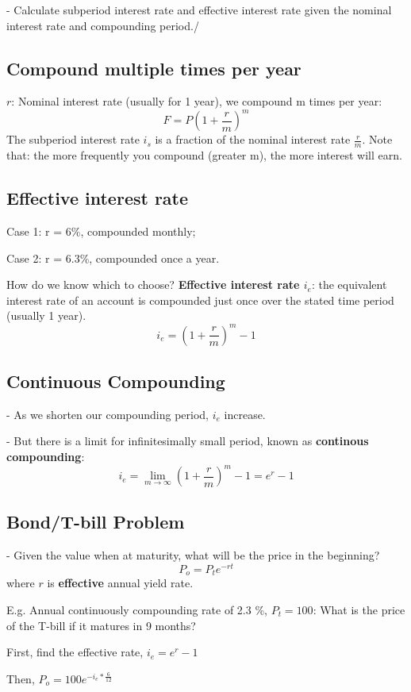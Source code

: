 \documentclass{article}
\begin{document}
- Calculate subperiod interest rate and effective interest rate given the nominal interest rate and compounding period./

\subsection*{Compound multiple times per year}

$r$: Nominal interest rate (usually for 1 year), we compound m times per year:
\[F = P(1+\frac{r}{m})^m\]
The subperiod interest rate $i_s$ is a fraction of the nominal interest rate $\frac{r}{m}$.
Note that: the more frequently you compound (greater m), the more interest will earn. 


\subsection*{Effective interest rate}

Case 1: r = 6\%, compounded monthly; 

Case 2: r = 6.3\%, compounded once a year.

How do we know which to choose?
\textbf{Effective interest rate $i_e$}: the equivalent interest rate of an account is compounded just once over the stated time period (usually 1 year).  
\[ i_e = (1+\frac{r}{m})^m - 1\]

\subsection*{Continuous Compounding}
- As we shorten our compounding period, $i_e$ increase.

- But there is a limit for infinitesimally small period, known as \textbf{continous compounding}:
\[i_e = \lim_{m\to\infty}(1 +\frac{r}{m})^m - 1 = e^r -1\]


\subsection*{Bond/T-bill Problem}
- Given the value when at maturity, what will be the price in the beginning?
\[ P_o = P_t e^{-rt}\] where $r$ is \textbf{effective} annual yield rate. 

E.g. Annual continuously compounding rate of 2.3 \%, $P_t = 100$: What is the price of the T-bill if it matures in 9 months?

First, find the effective rate, $i_e = e^r -1$ 

Then, $P_o = 100e^{-i_e * \frac{6}{12}}$
\end{document}
